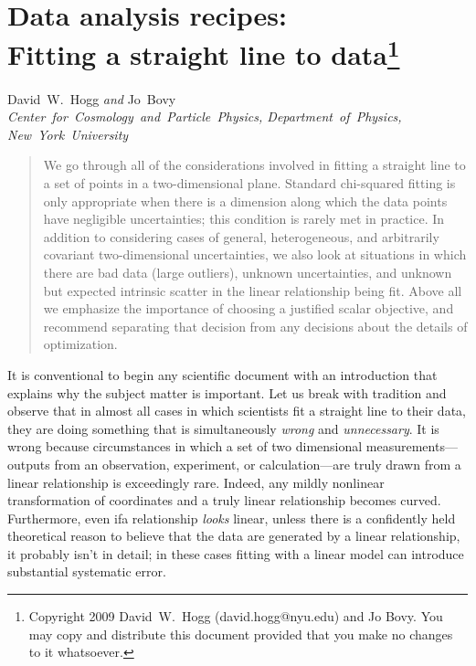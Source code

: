 \documentclass[12pt]{article}
\begin{document}
\section*{Data analysis recipes:\ \\
  Fitting a straight line to data\footnote{
    Copyright 2009 David~W.~Hogg (david.hogg@nyu.edu) and Jo Bovy.
    You may copy and distribute this document
    provided that you make no changes to it whatsoever.}}

\noindent
David~W.~Hogg \textsl{and}
Jo~Bovy\\
\textsl{Center~for~Cosmology~and~Particle~Physics, Department~of~Physics,\\
New~York~University}

\begin{abstract}
  We go through all of the considerations involved in fitting a
  straight line to a set of points in a two-dimensional plane.
  Standard chi-squared fitting is only appropriate when there is a
  dimension along which the data points have negligible uncertainties;
  this condition is rarely met in practice.  In addition to
  considering cases of general, heterogeneous, and arbitrarily
  covariant two-dimensional uncertainties, we also look at situations
  in which there are bad data (large outliers), unknown uncertainties,
  and unknown but expected intrinsic scatter in the linear
  relationship being fit.  Above all we emphasize the importance of
  choosing a justified scalar objective, and recommend separating that
  decision from any decisions about the details of optimization.
\end{abstract}

It is conventional to begin any scientific document with an
introduction that explains why the subject matter is important.  Let
us break with tradition and observe that in almost all cases in which
scientists fit a straight line to their data, they are doing something
that is simultaneously \emph{wrong} and \emph{unnecessary}.  It is
wrong because circumstances in which a set of two dimensional
measurements---outputs from an observation, experiment, or
calculation---are truly drawn from a linear relationship is
exceedingly rare.  Indeed, any mildly nonlinear transformation of
coordinates and a truly linear relationship becomes curved.
Furthermore, even ifa relationship \emph{looks} linear, unless there
is a confidently held theoretical reason to believe that the data are
generated by a linear relationship, it probably isn't in detail; in
these cases fitting with a linear model can introduce substantial
systematic error.
\end{document}
